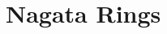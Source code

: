 \documentclass[../main]{subfiles}
\begin{document}
\chapter{Nagata Rings}\label{ch:12}

\setcounter{section}{30}

\end{document}
